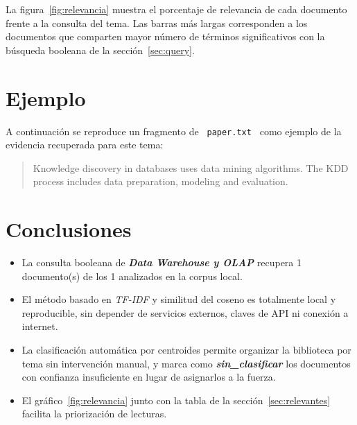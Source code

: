 \documentclass[11pt,a4paper]{article}
\newcommand{\tema}[1]{\textbf{\textit{#1}}}
\newcommand{\nombrearchivo}[1]{\texttt{#1}}
\begin{document}
La figura~\ref{fig:relevancia} muestra el porcentaje de relevancia de cada
documento frente a la consulta del tema. Las barras más largas corresponden a
los documentos que comparten mayor número de términos significativos con la
búsqueda booleana de la sección~\ref{sec:query}.


\section{Ejemplo}
\label{sec:ejemplo}

A continuación se reproduce un fragmento de
\nombrearchivo{ paper.txt } como ejemplo de la evidencia
recuperada para este tema:

\begin{quote}
\small
Knowledge discovery in databases uses data mining algorithms. The KDD process includes data preparation, modeling and evaluation.
\end{quote}


\section{Conclusiones}
\label{sec:conclusiones}

\begin{itemize}
\setlength{\itemsep}{4pt}
  \item La consulta booleana de \tema{ Data Warehouse y OLAP } recupera
        1 documento(s) de los 1
        analizados en la corpus local.
  \item El método basado en \textit{TF-IDF} y similitud del coseno es
        totalmente local y reproducible, sin depender de servicios externos,
        claves de API ni conexión a internet.
  \item La clasificación automática por centroides permite organizar la
        biblioteca por tema sin intervención manual, y marca como
        \tema{sin\_clasificar} los documentos con confianza insuficiente en
        lugar de asignarlos a la fuerza.
  \item El gráfico~\ref{fig:relevancia} junto con la tabla de la
        sección~\ref{sec:relevantes} facilita la priorización de lecturas.
\end{itemize}
\end{document}
